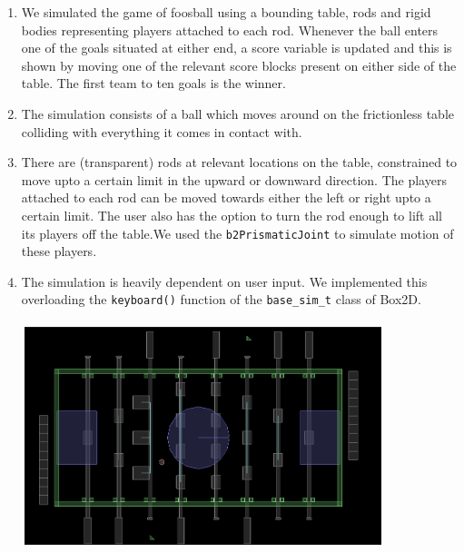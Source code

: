 \documentclass{article}
\begin{document}
\begin{enumerate}
\item We simulated the game of foosball using a bounding table, rods and rigid bodies representing players attached to each rod. Whenever the ball enters one of the goals situated at either end, a score variable is updated and this is shown by moving one of the relevant score blocks present on either side of the table. The first team to ten goals is the winner.\\
\item The simulation consists of a ball which moves around on the frictionless table colliding with everything it comes in contact with.\\
\item There are (transparent) rods at relevant locations on the table, constrained to move upto a certain limit in the upward or downward direction. The players attached to each rod can be moved towards either the left or right upto a certain limit. The user also has the option to turn the rod enough to lift all its players off the table.We used the \texttt{b2PrismaticJoint} to simulate motion of these players.\\
\item The simulation is heavily dependent on user input. We implemented this overloading the \texttt{keyboard()} function of the \texttt{base\_sim\_t} class of Box2D.\\ \\
\includegraphics[width=300pt,height=180pt]{Foosball_2}
\end{enumerate}
\end{document}
